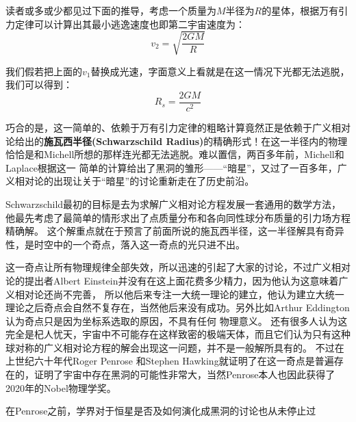 \documentclass{ctexart}
\begin{document}
    读者或多或少都见过下面的推导，考虑一个质量为$M$半径为$R$的星体，根据万有引力定律可以计算出其最小逃逸速度也即第二宇宙速度为：
    \begin{equation}
        v_2=\sqrt{\frac{2GM}{R}}
    \end{equation}
    
    我们假若把上面的$v_1$替换成光速，字面意义上看就是在这一情况下光都无法逃脱，我们可以得到：
    \begin{equation}
        R_s=\frac{2GM}{c^2}
    \end{equation}
    
    巧合的是，这一简单的、依赖于万有引力定律的粗略计算竟然正是依赖于广义相对论给出的\textbf{施瓦西半径(Schwarzschild Radius)}的精确形式！在这一半径内的物理
    恰恰是和Michell所想的那样连光都无法逃脱。难以置信，两百多年前，Michell和Laplace根据这一 简单的计算给出了黑洞的雏形——“暗星”，又过了一百多年，广义相对论的出现让关于“暗星”的讨论重新走在了历史前沿。
    
    Schwarzschild最初的目标是去为求解广义相对论方程发展一套通用的数学方法，他最先考虑了最简单的情形求出了点质量分布和各向同性球分布质量的引力场方程精确解。\cite{Schwarzschild.K}
    这个解重点就在于预言了前面所说的施瓦西半径，这一半径解具有奇异性，是时空中的一个奇点，落入这一奇点的光只进不出。

    这一奇点让所有物理规律全部失效，所以迅速的引起了大家的讨论，不过广义相对论的提出者Albert Einstein并没有在这上面花费多少精力，因为他认为这意味着广义相对论还尚不完善，
    所以他后来专注一大统一理论的建立，他认为建立大统一理论之后奇点会自然不复存在，当然他后来没有成功。另外比如Arthur Eddington 认为奇点只是因为坐标系选取的原因，不具有任何
    物理意义。\cite{EA} 还有很多人认为这完全是杞人忧天，宇宙中不可能存在这样致密的极端天体，而且它们认为只有这种球对称的广义相对论方程的解会出现这一问题，并不是一般解所具有的。
    不过在上世纪六十年代Roger Penrose 和Stephen Hawking就证明了在这一奇点是普遍存在的\cite{RP}，证明了宇宙中存在黑洞的可能性非常大，当然Penrose本人也因此获得了2020年的Nobel物理学奖。

    在Penrose之前，学界对于恒星是否及如何演化成黑洞的讨论也从未停止过










    
    
\end{document}

